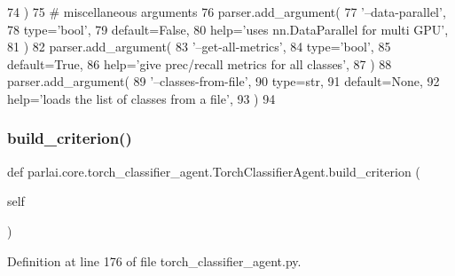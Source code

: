 \begin{DoxyCode}
74         )
75         \textcolor{comment}{# miscellaneous arguments}
76         parser.add\_argument(
77             \textcolor{stringliteral}{'--data-parallel'},
78             type=\textcolor{stringliteral}{'bool'},
79             default=\textcolor{keyword}{False},
80             help=\textcolor{stringliteral}{'uses nn.DataParallel for multi GPU'},
81         )
82         parser.add\_argument(
83             \textcolor{stringliteral}{'--get-all-metrics'},
84             type=\textcolor{stringliteral}{'bool'},
85             default=\textcolor{keyword}{True},
86             help=\textcolor{stringliteral}{'give prec/recall metrics for all classes'},
87         )
88         parser.add\_argument(
89             \textcolor{stringliteral}{'--classes-from-file'},
90             type=str,
91             default=\textcolor{keywordtype}{None},
92             help=\textcolor{stringliteral}{'loads the list of classes from a file'},
93         )
94 
\end{DoxyCode}
\mbox{\label{classparlai_1_1core_1_1torch__classifier__agent_1_1TorchClassifierAgent_adeab756c0b58667aaf417575c23d1dfb}} 
\subsubsection{\texorpdfstring{build\+\_\+criterion()}{build\_criterion()}}
{\footnotesize\ttfamily def parlai.\+core.\+torch\+\_\+classifier\+\_\+agent.\+Torch\+Classifier\+Agent.\+build\+\_\+criterion (\begin{DoxyParamCaption}\item[{}]{self }\end{DoxyParamCaption})}



Definition at line 176 of file torch\+\_\+classifier\+\_\+agent.\+py.


